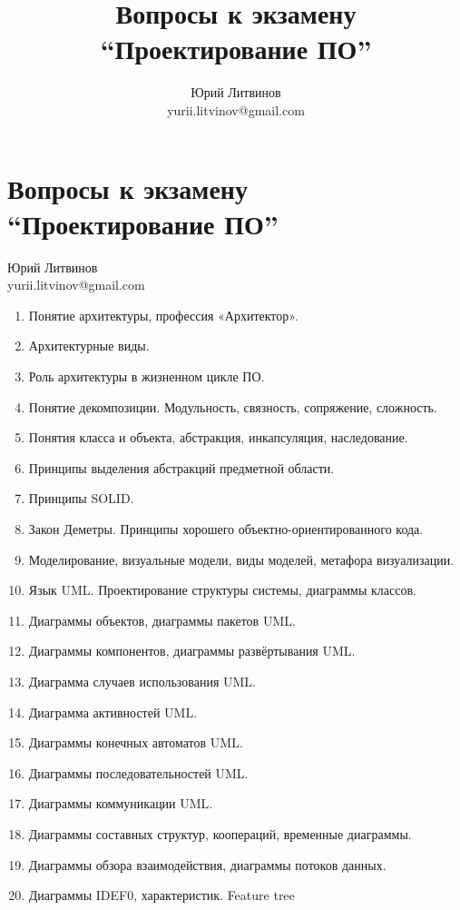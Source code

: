 \documentclass[a5paper]{article}
\title{Вопросы к экзамену ``Проектирование ПО''}
\author{Юрий Литвинов\\\small{yurii.litvinov@gmail.com}}
\begin{document}
\thispagestyle{empty}

\section*{Вопросы к экзамену ``Проектирование ПО''}

\begin{flushright}\begin{small}Юрий Литвинов\\\small{yurii.litvinov@gmail.com}\end{small}\end{flushright}

\begin{enumerate}
    \item Понятие архитектуры, профессия «Архитектор».
    \item Архитектурные виды.
    \item Роль архитектуры в жизненном цикле ПО.
    \item Понятие декомпозиции. Модульность, связность, сопряжение, сложность.
    \item Понятия класса и объекта, абстракция, инкапсуляция, наследование. 
    \item Принципы выделения абстракций предметной области.
    \item Принципы SOLID.
    \item Закон Деметры. Принципы хорошего объектно-ориентированного кода.
    \item Моделирование, визуальные модели, виды моделей, метафора визуализации.
    \item Язык UML. Проектирование структуры системы, диаграммы классов.
    \item Диаграммы объектов, диаграммы пакетов UML.
    \item Диаграммы компонентов, диаграммы развёртывания UML.
    \item Диаграмма случаев использования UML.
    \item Диаграмма активностей UML.
    \item Диаграммы конечных автоматов UML.
    \item Диаграммы последовательностей UML.
    \item Диаграммы коммуникации UML.
    \item Диаграммы составных структур, коопераций, временные диаграммы.
    \item Диаграммы обзора взаимодействия, диаграммы потоков данных.
    \item Диаграммы IDEF0, характеристик. Feature tree 

\end{enumerate}
\end{document}
